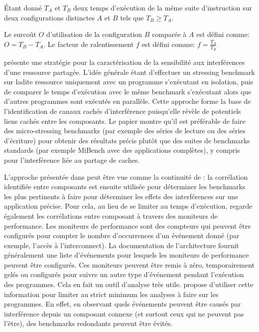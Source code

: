 \begin{definition}
\label{fr:def:slowdownfactor}
Étant donné $T_A$ et $T_B$
deux temps d'exécution de la même suite d'instruction sur deux configurations
distinctes $A$ et $B$ tels que $T_B \ge T_A$.

Le surcoût $O$ d'utilisation de
la configuration $B$ comparée à $A$ est défini comme:
$ O = T_B - T_A$.
Le facteur
de ralentissement $f$ est défini comme:
$f = \frac{T_A}{T_B}$
\end{definition}




\cite{10.1145/2086696.2086713} présente une stratégie pour la caractérisation
de la sensibilité aux interférences d'une ressource partagée. L'idée générale
étant d'effectuer un stressing benchmark sur ladite ressource uniquement avec
un programme s'exécutant en isolation, puis de comparer le
temps d'exécution avec le même benchmark s'exécutant alors que d'autres
programmes sont exécutés en parallèle. 
Cette approche forme la base de l'identification de canaux cachés
d'interférence puisqu'elle révèle de potentiels liens cachés entre les
composants.
Le papier montre qu'il est
préférable de faire des micro-stressing benchmarks (par exemple des séries de lecture ou des séries d'écriture)
pour obtenir des résultats
précis plutôt que des suites de benchmarks standards (par exemple MiBench avec des applications complètes), y compris pour
l'interférence liée au partage de caches.

L'approche présentée dans \cite{Bin14} peut être vue comme la continuité de
\cite{10.1145/2086696.2086713}: la corrélation identifiée entre composants
est ensuite utilisée pour déterminer les benchmarks les plus pertinents à faire pour déterminer les effets des interférences
sur une application précise. Pour cela, au lieu de se limiter au temps d'exécution,
\cite{Bin14} regarde également les corrélations entre composant
à travers des moniteurs de performance.
Les moniteurs de performance sont des compteurs qui peuvent être configurés pour
compter le nombre d'occurrences d'un événement donné (par exemple, l'accès à
l'interconnect). La documentation de l'architecture fournit généralement une
liste d'événements pour lesquels les moniteurs de performance peuvent être
configurés. Ces moniteurs peuvent être remis à zéro, temporairement gelés
ou configurés pour suivre un autre type d'événement pendant l'exécution des
programmes. Cela en fait un outil d'analyse très utile.
\cite{Bin14} propose d'utiliser cette information pour limiter au strict minimum
les analyses à faire sur les programmes. En effet, en observant quels
événements peuvent être causés par interférence depuis un composant connexe
(et surtout ceux qui ne peuvent pas l'être), des benchmarks redondants
peuvent être évités.

